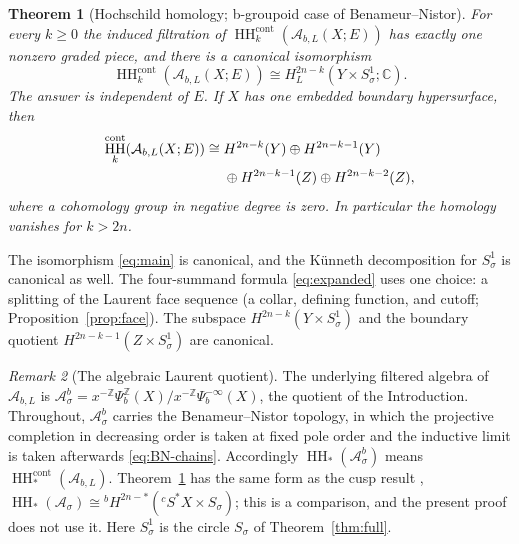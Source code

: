 \documentclass[11pt,oneside,reqno]{article}
\DeclareMathOperator{\HH}{HH}
\newcommand{\C}{\mathbb C}
\newcommand{\Z}{\mathbb Z}
\newcommand{\cA}{\mathcal A}
\newcommand{\Asb}{\mathcal A^b_\sigma}
\theoremstyle{plain}
\newtheorem{theorem}{Theorem}[section]
\theoremstyle{definition}
\theoremstyle{remark}
\newtheorem{remark}[theorem]{Remark}
\begin{document}
\begin{theorem}[Hochschild homology; b-groupoid case of
Benameur--Nistor]\label{thm:main}
For every \(k\geq0\) the induced filtration of
\(\HH_k^{\mathrm{cont}}(\cA_{b,L}(X;E))\) has exactly one nonzero graded
piece, and there is a canonical isomorphism
\begin{equation}\label{eq:main}
 \boxed{
 \HH_k^{\mathrm{cont}}(\cA_{b,L}(X;E))
 \cong H_L^{2n-k}(Y\times S^1_\sigma;\C).}
\end{equation}
The answer is independent of \(E\). If \(X\) has one embedded boundary
hypersurface, then
\begin{align}\label{eq:expanded}
 \HH_k^{\mathrm{cont}}(\cA_{b,L}(X;E))
 \cong{}& H^{2n-k}(Y)
 \oplus H^{2n-k-1}(Y) \notag\\
 &\oplus H^{2n-k-1}(Z)
 \oplus H^{2n-k-2}(Z),
\end{align}
where a cohomology group in negative degree is zero. In particular the
homology vanishes for \(k>2n\).
\end{theorem}

The isomorphism \eqref{eq:main} is canonical, and
the K\"unneth decomposition for \(S^1_\sigma\) is canonical as well. The
four-summand formula \eqref{eq:expanded} uses one choice: a splitting of
the Laurent face sequence (a collar, defining function, and cutoff;
Proposition~\ref{prop:face}). The subspace
\(H^{2n-k}(Y\times S^1_\sigma)\) and the boundary quotient
\(H^{2n-k-1}(Z\times S^1_\sigma)\) are canonical.

\begin{remark}[The algebraic Laurent quotient]\label{rem:Asb}
The underlying filtered algebra of \(\cA_{b,L}\) is
\(\Asb=x^{-\Z}\Psi_b^{\Z}(X)/x^{-\Z}\Psi_b^{-\infty}(X)\), the quotient of
the Introduction. Throughout, \(\Asb\) carries the Benameur--Nistor
topology, in which the projective completion in decreasing order is taken
at fixed pole order and the inductive limit is taken afterwards
\eqref{eq:BN-chains}. Accordingly \(\HH_*(\Asb)\) means
\(\HH_*^{\mathrm{cont}}(\cA_{b,L})\). Theorem~\ref{thm:main} has the same form
as the cusp result \cite[Prop.~2]{MN}, \(\HH_*(\cA_\sigma)\cong
{}^bH^{2n-*}({}^cS^*X\times S_\sigma)\); this is a comparison, and the
present proof does not use it. Here \(S^1_\sigma\) is the circle
\(S_\sigma\) of Theorem~\ref{thm:full}.
\end{remark}
\end{document}
